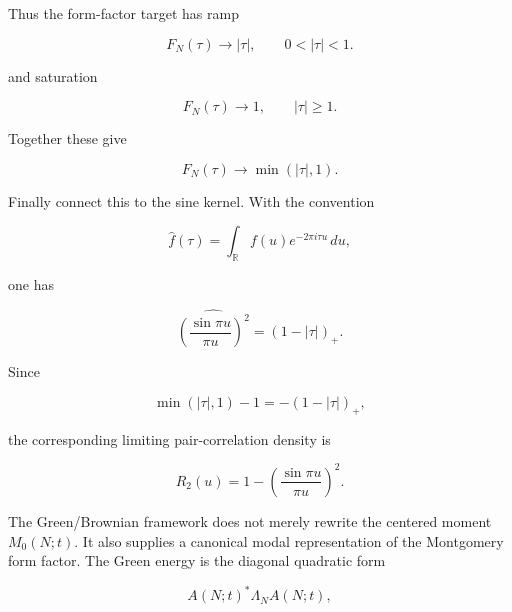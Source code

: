 \documentclass[11pt]{amsart}
\numberwithin{equation}{section}
\theoremstyle{plain}
\theoremstyle{definition}
\theoremstyle{remark}
\begin{document}
Thus the form-factor target has ramp

\begin{equation}
F_N(\tau)\to |\tau|,
\qquad
0<|\tau|<1.
\label{eq:montgomery_ramp_limit}
\end{equation}

and saturation

\begin{equation}
F_N(\tau)\to 1,
\qquad
|\tau|\ge 1.
\label{eq:montgomery_saturation_limit}
\end{equation}

Together these give

\begin{equation}
F_N(\tau)\to\min(|\tau|,1).
\label{eq:montgomery_ramp_saturation_combined}
\end{equation}

Finally connect this to the sine kernel. With the convention

\begin{equation}
\widehat f(\tau)
=
\int_{\mathbb R}f(u)e^{-2\pi i\tau u}\,du,
\label{eq:fourier_transform_convention}
\end{equation}

one has

\begin{equation}
\widehat{
\left(
\frac{\sin \pi u}{\pi u}
\right)^2
}
=
(1-|\tau|)_+.
\label{eq:sine_square_fourier_transform}
\end{equation}

Since

\begin{equation}
\min(|\tau|,1)-1
=
-(1-|\tau|)_+,
\label{eq:form_factor_minus_one_triangle}
\end{equation}

the corresponding limiting pair-correlation density is

\begin{equation}
R_2(u)
=
1-
\left(\frac{\sin \pi u}{\pi u}\right)^2.
\label{eq:gue_pair_correlation_density}
\end{equation}

The Green/Brownian framework does not merely rewrite the centered moment
\(M_0(N;t)\). It also supplies a canonical modal representation of the
Montgomery form factor. The Green energy is the diagonal quadratic form

\begin{equation}
A(N;t)^*\Lambda_N A(N;t),
\label{eq:green_energy_matrix_form}
\end{equation}
\end{document}
